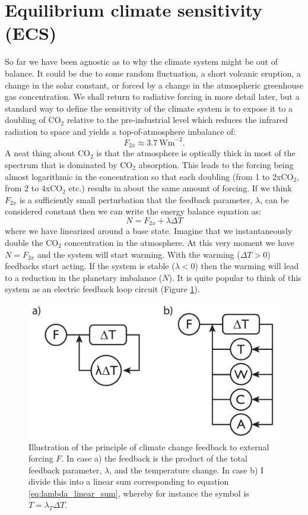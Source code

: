 \documentclass[12pt]{book}
\begin{document}
\section{Equilibrium climate sensitivity (ECS)}
So far we have been agnostic as to why the climate system might be out of balance. It could be due to some random fluctuation, a short volcanic eruption, a change in the solar constant, or forced by a change in the atmospheric greenhouse gas concentration. We shall return to radiative forcing in more detail later, but a standard way to define the sensitivity of the climate system is to expose it to a doubling of CO$_2$ relative to the pre-industrial level which reduces the infrared radiation to space and yields a top-of-atmosphere imbalance of:
$$F_{2x} \approx 3.7 \ \textrm{Wm}^{-2}.$$
A neat thing about CO$_2$ is that the atmosphere is optically thick in most of the spectrum that is dominated by CO$_2$ absorption. This leads to the forcing being almost logarithmic in the concentration so that each doubling (from 1 to 2xCO$_2$, from 2 to 4xCO$_2$ etc.) results in about the same amount of forcing. If we think $F_{2x}$ is a sufficiently small perturbation that the feedback parameter, $\lambda$, can be considered constant then we can write the energy balance equation as:
\begin{equation}
N = F_{2x} + \lambda \Delta T
\label{eq:linear_energy_balance}
\end{equation}
where we have linearized around a base state. Imagine that we instantaneously double the CO$_2$ concentration in the atmosphere. At this very moment we have $N=F_{2x}$ and the system will start warming. With the warming ($\Delta T > 0$) feedbacks start acting. If the system is stable ($\lambda < 0$) then the warming will lead to a reduction in the planetary imbalance ($N$). It is quite popular to think of this system as an electric feedback loop circuit (Figure \ref{fig:feedback_illustration}). 

\begin{figure}
	\begin{center}
		\includegraphics[width=9 cm]{../illustrations/Feedback_illustration.pdf}
	\end{center}
	\caption{ Illustration of the principle of climate change feedback to external forcing $F$. In case a) the feedback is the product of the total feedback parameter, $\lambda$, and the temperature change. In case b) I divide this into a linear sum corresponding to equation \ref{eq:lambda_linear_sum}, whereby for instance the symbol is $T=\lambda_T \Delta T$. } 
	\label{fig:feedback_illustration}
\end{figure}
\end{document}
